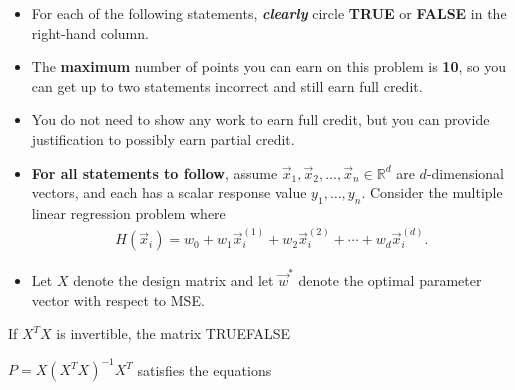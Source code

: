 \documentclass[twoside,12pt]{article}
\newcommand{\avocado}{%
  \begingroup\normalfont
  \texttt{[image: pics/avo.png]}%
  \endgroup
}
\newcommand{\avo}[1]{\multido{}{#1}{\avocado}\hspace{0.2em}}
\begin{document}
\begin{probset}

    \begin{prob}[({10} points)]

        \begin{itemize}
            \item For each of the following statements, \textbf{\textit{clearly}} circle \textbf{TRUE} or \textbf{FALSE} in the right-hand column. 
            \item The \textbf{maximum} number of points you can earn on this problem is \textbf{10}, so you can get up to two statements incorrect and still earn full credit.
            \item You do not need to show any work to earn full credit, but you can provide justification to possibly earn partial credit.
            \item \textbf{For all statements to follow}, assume $\vec{x}_1, \vec{x}_2, \dotsc, \vec{x}_n\in\mathbb{R}^{d}$ are $d$-dimensional vectors, and each has a scalar response value $y_1,\dotsc, y_n$. Consider the multiple linear regression problem where 
                \begin{align*}
                    H(\vec{x}_i) = w_0 + w_1 \vec{x}_i^{(1)} + w_2 \vec{x}_i^{(2)} + \cdots + w_{d}\vec{x}_i^{(d)}.
                \end{align*}
            \item Let $X$ denote the design matrix and let $\vec{w}^\ast$ denote the optimal parameter vector with respect to MSE.
        \end{itemize}
        

        \begin{subprobset}

            \begin{subprob}\avo{2}
                If $X^TX$ is invertible, the matrix {\hfill TRUE\hspace{.5in}FALSE}
                
                $P = X(X^TX)^{-1}X^T$ satisfies the equations
                

\end{subprob}
\end{subprobset}
\end{prob}
\end{probset}
\end{document}
